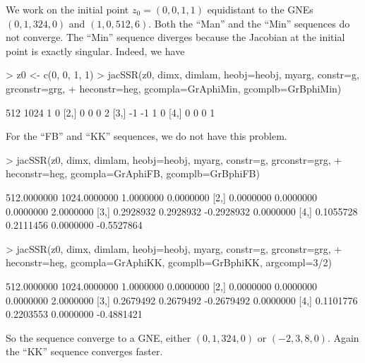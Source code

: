 \documentclass[11pt, a4paper]{article}
\begin{document}
We work on the initial point $z_0 = (0, 0, 1,  1)$ equidistant to the GNEs $(0, 1, 324, 0)$ and $(1, 0, 512, 6)$. Both the ``Man'' and the ``Min'' sequences do not converge. The ``Min'' sequence diverges because the Jacobian at the initial point is exactly singular. Indeed, we have
\begin{Schunk}
\begin{Sinput}
> z0 <- c(0, 0, 1, 1)
> jacSSR(z0, dimx, dimlam, heobj=heobj, myarg, constr=g, grconstr=grg, 
+ 	heconstr=heg, gcompla=GrAphiMin, gcomplb=GrBphiMin)
\end{Sinput}
\begin{Soutput}
     [,1] [,2] [,3] [,4]
[1,]  512 1024    1    0
[2,]    0    0    0    2
[3,]   -1   -1    1    0
[4,]    0    0    0    1
\end{Soutput}
\end{Schunk}
For the ``FB'' and ``KK'' sequences, we do not have this problem.
\begin{Schunk}
\begin{Sinput}
> jacSSR(z0, dimx, dimlam, heobj=heobj, myarg, constr=g, grconstr=grg, 
+ 	heconstr=heg, gcompla=GrAphiFB, gcomplb=GrBphiFB)
\end{Sinput}
\begin{Soutput}
            [,1]         [,2]       [,3]       [,4]
[1,] 512.0000000 1024.0000000  1.0000000  0.0000000
[2,]   0.0000000    0.0000000  0.0000000  2.0000000
[3,]   0.2928932    0.2928932 -0.2928932  0.0000000
[4,]   0.1055728    0.2111456  0.0000000 -0.5527864
\end{Soutput}
\begin{Sinput}
> jacSSR(z0, dimx, dimlam, heobj=heobj, myarg, constr=g, grconstr=grg, 
+ 	heconstr=heg, gcompla=GrAphiKK, gcomplb=GrBphiKK, argcompl=3/2)
\end{Sinput}
\begin{Soutput}
            [,1]         [,2]       [,3]       [,4]
[1,] 512.0000000 1024.0000000  1.0000000  0.0000000
[2,]   0.0000000    0.0000000  0.0000000  2.0000000
[3,]   0.2679492    0.2679492 -0.2679492  0.0000000
[4,]   0.1101776    0.2203553  0.0000000 -0.4881421
\end{Soutput}
\end{Schunk}
So the sequence converge to a GNE, either $(0, 1, 324, 0)$ or $(-2, 3, 8, 0)$. Again the ``KK'' sequence converges faster.
\end{document}
